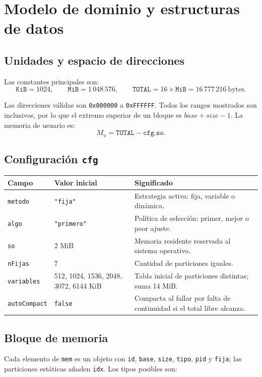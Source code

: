 \documentclass[11pt,a4paper]{article}
\begin{document}
\section{Modelo de dominio y estructuras de datos}

\subsection{Unidades y espacio de direcciones}

Las constantes principales son:
\[
  \texttt{KiB}=1024,\qquad \texttt{MiB}=1\,048\,576,\qquad
  \texttt{TOTAL}=16\times\texttt{MiB}=16\,777\,216\ \text{bytes}.
\]

Las direcciones válidas son \texttt{0x000000} a \texttt{0xFFFFFF}. Todos los
rangos mostrados son inclusivos, por lo que el extremo superior de un bloque es
\(base + size - 1\). La memoria de usuario es:
\[
  M_u=\texttt{TOTAL}-\texttt{cfg.so}.
\]

\subsection{Configuración \texttt{cfg}}

\begin{longtable}{p{}p{}p{}}
\toprule
\textbf{Campo} & \textbf{Valor inicial} & \textbf{Significado}\\
\midrule
\endhead
\texttt{metodo} & \texttt{"fija"} & Estrategia activa: fija, variable o dinámica.\\
\texttt{algo} & \texttt{"primero"} & Política de selección: primer, mejor o peor ajuste.\\
\texttt{so} & 2 MiB & Memoria residente reservada al sistema operativo.\\
\texttt{nFijas} & 7 & Cantidad de particiones iguales.\\
\texttt{variables} & 512, 1024, 1536, 2048, 3072, 6144 KiB & Tabla inicial de particiones distintas; suma 14 MiB.\\
\texttt{autoCompact} & \texttt{false} & Compacta al fallar por falta de continuidad si el total libre alcanza.\\
\bottomrule
\end{longtable}

\subsection{Bloque de memoria}

Cada elemento de \texttt{mem} es un objeto con \texttt{id}, \texttt{base},
\texttt{size}, \texttt{tipo}, \texttt{pid} y \texttt{fija}; las particiones
estáticas añaden \texttt{idx}. Los tipos posibles son:
\end{document}
